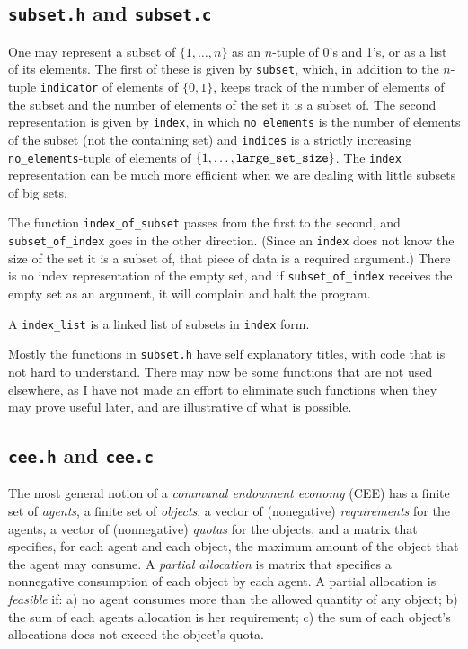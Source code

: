 \documentclass[12pt]{article}
\theoremstyle{definition}
\begin{document}
\begin{appendix}
\subsection{\texttt{subset.h} and \texttt{subset.c}}

One may represent a subset of $\{1, \ldots, n\}$ as an $n$-tuple of
0's and 1's, or as a list of its elements.  The first of these is
given by \texttt{subset}, which, in addition to the $n$-tuple
\texttt{indicator} of elements of $\{0,1\}$, keeps track of the number
of elements of the subset and the number of elements of the set it is
a subset of.  The second representation is given by \texttt{index}, in
which \texttt{no\_elements} is the number of elements of the subset
(not the containing set) and \texttt{indices} is a strictly increasing
\texttt{no\_elements}-tuple of elements of $\{1, \ldots,
\text{\texttt{large\_set\_size}}\}$.  The \texttt{index}
representation can be much more efficient when we are dealing with
little subsets of big sets.

The function
\texttt{index\_of\_subset} passes from the first to the second, and
\texttt{subset\_of\_index} goes in the other direction.  (Since an
\texttt{index} does not know the size of the set it is a subset of,
that piece of data is a required argument.) There is no index
representation of the empty set, and if \texttt{subset\_of\_index}
receives the empty set as an argument, it will complain and halt the
program.

A \texttt{index\_list} is a linked list of subsets in \texttt{index}
form.  

Mostly the functions in \texttt{subset.h} have self explanatory
titles, with code that is not hard to understand.  There may now be
some functions that are not used elsewhere, as I have not made an
effort to eliminate such functions when they may prove useful later,
and are illustrative of what is possible.

\subsection{\texttt{cee.h} and \texttt{cee.c}}

The most general notion of a \emph{communal endowment economy} (CEE)
has a finite set of \emph{agents}, a finite set of \emph{objects}, a
vector of (nonegative) \emph{requirements} for the agents, a vector of
(nonnegative) \emph{quotas} for the objects, and a matrix that
specifies, for each agent and each object, the maximum amount of the
object that the agent may consume.  A \emph{partial allocation} is
matrix that specifies a nonnegative consumption of each object by each
agent.  A partial allocation is \emph{feasible} if: a) no agent
consumes more than the allowed quantity of any object; b) the sum of
each agents allocation is her requirement; c) the sum of each object's
allocations does not exceed the object's quota.


\end{appendix}
\end{document}
